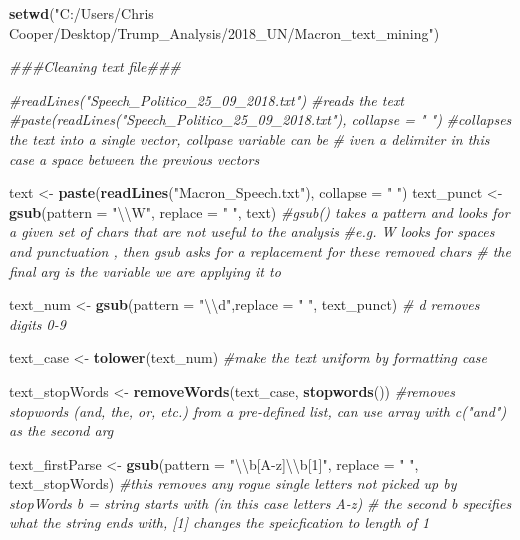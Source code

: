 \documentclass[]{article}
\newenvironment{Shaded}{\begin{snugshade}}{\end{snugshade}}
\newcommand{\CharTok}[1]{\textcolor[rgb]{0.31,0.60,0.02}{#1}}
\newcommand{\CommentTok}[1]{\textcolor[rgb]{0.56,0.35,0.01}{\textit{#1}}}
\newcommand{\DataTypeTok}[1]{\textcolor[rgb]{0.13,0.29,0.53}{#1}}
\newcommand{\KeywordTok}[1]{\textcolor[rgb]{0.13,0.29,0.53}{\textbf{#1}}}
\newcommand{\NormalTok}[1]{#1}
\newcommand{\StringTok}[1]{\textcolor[rgb]{0.31,0.60,0.02}{#1}}
\begin{document}
\begin{Shaded}
\begin{Highlighting}[]
\KeywordTok{setwd}\NormalTok{(}\StringTok{"C:/Users/Chris Cooper/Desktop/Trump_Analysis/2018_UN/Macron_text_mining"}\NormalTok{)}


\CommentTok{###Cleaning text file###}

\CommentTok{#readLines("Speech_Politico_25_09_2018.txt") #reads the text}
\CommentTok{#paste(readLines("Speech_Politico_25_09_2018.txt"), collapse = " ")}
    \CommentTok{#collapses the text into a single vector, collpase variable can be }
    \CommentTok{# iven a delimiter in this case a space between the previous vectors}

\NormalTok{text <-}\StringTok{ }\KeywordTok{paste}\NormalTok{(}\KeywordTok{readLines}\NormalTok{(}\StringTok{"Macron_Speech.txt"}\NormalTok{), }\DataTypeTok{collapse =} \StringTok{" "}\NormalTok{)}
\NormalTok{text_punct <-}\StringTok{ }\KeywordTok{gsub}\NormalTok{(}\DataTypeTok{pattern =} \StringTok{"}\CharTok{\textbackslash{}\textbackslash{}}\StringTok{W"}\NormalTok{, }\DataTypeTok{replace =} \StringTok{" "}\NormalTok{, text)    }
    \CommentTok{#gsub() takes a pattern and looks for a given set of chars that are not useful to the analysis }
    \CommentTok{#e.g. W looks for spaces and punctuation , then gsub asks for a replacement for these removed chars}
    \CommentTok{# the final arg is the variable we are applying it to}

\NormalTok{text_num <-}\StringTok{ }\KeywordTok{gsub}\NormalTok{(}\DataTypeTok{pattern =} \StringTok{"}\CharTok{\textbackslash{}\textbackslash{}}\StringTok{d"}\NormalTok{,}\DataTypeTok{replace =} \StringTok{" "}\NormalTok{, text_punct)     }
    \CommentTok{# d removes digits 0-9}

\NormalTok{text_case <-}\StringTok{ }\KeywordTok{tolower}\NormalTok{(text_num)  }
    \CommentTok{#make the text uniform by formatting case}

\NormalTok{text_stopWords <-}\StringTok{ }\KeywordTok{removeWords}\NormalTok{(text_case, }\KeywordTok{stopwords}\NormalTok{()) }
    \CommentTok{#removes stopwords (and, the, or, etc.) from a pre-defined list, can use array with c("and") as the second arg}

\NormalTok{text_firstParse <-}\StringTok{ }\KeywordTok{gsub}\NormalTok{(}\DataTypeTok{pattern  =} \StringTok{"}\CharTok{\textbackslash{}\textbackslash{}}\StringTok{b[A-z]}\CharTok{\textbackslash{}\textbackslash{}}\StringTok{b[1]"}\NormalTok{, }\DataTypeTok{replace =} \StringTok{" "}\NormalTok{,  text_stopWords)}
    \CommentTok{#this removes any rogue single letters not picked up by stopWords b = string starts with (in this case letters A-z)}
    \CommentTok{# the second b specifies  what the string ends with, [1] changes the speicfication to length of 1}


\end{Highlighting}
\end{Shaded}
\end{document}
